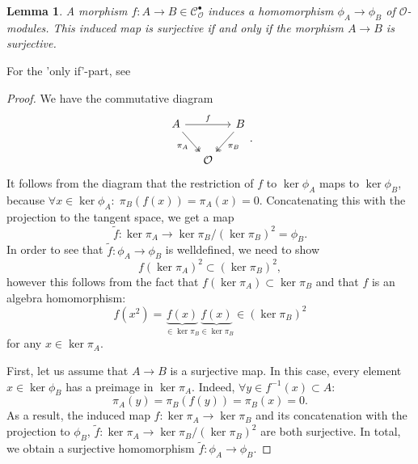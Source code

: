 \documentclass{article}
\theoremstyle{plain}%
\newtheorem{lemma}{Lemma}[section]
\theoremstyle{definition}
\theoremstyle{remark}
\newcommand{\cob}{\mathcal{C}_\mathcal{O}^\bullet}
\begin{document}
\begin{lemma}\label{lem:surjectivity_phi}
    A morphism \(f\colon A \to B \in \cob\) induces a homomorphism \(\phi_A \to \phi_B\) of \(\mathcal{O}\)-modules.
    This induced map is surjective if and only if the morphism \(A \to B\) is surjective.
\end{lemma}
For the 'only if'-part, see \cites[lemma 5.5]{darmon1995fermat}%
[theorem 8.4]{Matsumura1986}[ch. II, lemma 7.4]{Hartshorne1977}[\href{https://stacks.math.columbia.edu/tag/090T}{Tag 090T}]{stacks-project}
\begin{proof}
    We have the commutative diagram
    \[
    \begin{tikzcd}[column sep=small]
        A \arrow[rr, "f"] \arrow [dr, "\pi_A", swap, twoheadrightarrow] & & B \arrow [dl, "\pi_B", twoheadrightarrow]\\
        & \mathcal{O} &
    \end{tikzcd}.
    \]
    It follows from the diagram that the restriction of \(f\) to \(\ker \phi_A\) maps to \(\ker \phi_B\),
    because \(\forall x \in \ker \phi_A\colon\; \pi_B(f(x)) = \pi_A(x) = 0\).
    Concatenating this with the projection to the tangent space, we get a map
    \[
        \tilde f\colon \ker \pi_A \to \ker \pi_B/(\ker \pi_B)^2 = \phi_B.
    \]
    In order to see that \(\tilde f\colon \phi_A \to \phi_B\) is welldefined, we need to show 
    \[
        f(\ker \pi_A)^2 \subset (\ker \pi_B)^2,
    \]
    however this follows from the fact that \(f(\ker \pi_A) \subset \ker \pi_B\) and that \(f\) is an algebra
    homomorphism:
    \[
        f(x^2) = \underbrace{f(x)}_{\in \ker \pi_B}\underbrace{f(x)}_{\in \ker \pi_B} \in (\ker \pi_B)^2 
    \]
    for any \(x \in \ker \pi_A\).

    First, let us assume that \(A \to B\) is a surjective map.
    In this case, every element \(x \in \ker \phi_B\) has a preimage in \(\ker \pi_A\). 
    Indeed, \(\forall y \in f^{-1}(x)\subset A\colon\)
    \[
        \pi_A(y) = \pi_B(f(y)) = \pi_B(x) = 0.
    \]
    As a result, the induced map \(f\colon \ker \pi_A \to \ker \pi_B\) and its concatenation with
    the projection to \(\phi_B\), \(\tilde f\colon \ker \pi_A \to \ker \pi_B/(\ker \pi_B)^2\) are both surjective.
    In total, we obtain a surjective homomorphism \(\tilde f\colon \phi_A \to \phi_B\).
    

\end{proof}
\end{document}
